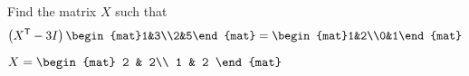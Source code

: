 
\begin{Exercise}[
name={},
title={}, 
difficulty=0,
origin={\cite{MH}}]
Find the matrix $X$ such that\qquad \[\left(\trans{X}-3I\right)\begin{mat}1&3\\2&5\end{mat}=\begin{mat}1&2\\0&1\end{mat}\]
\end{Exercise}

\begin{Answer}
$X=\begin{mat}
2 & 2\\
1 & 2
\end{mat}$
\end{Answer}
